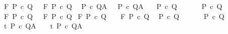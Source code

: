 \begin{isabellebody}
\ {\isachardoublequoteopen}{\isasymGamma}{\isacharcomma}{\isasymTheta}{\isasymturnstile}\isactrlbsub {\isacharslash}F\isactrlesub \ P\ c\ Q{\isachardoublequoteclose}\ \ {\isacharequal}{\isacharequal}\ {\isachardoublequoteopen}{\isasymGamma}{\isacharcomma}{\isasymTheta}{\isasymturnstile}\isactrlbsub {\isacharslash}F\isactrlesub \ P\ c\ Q{\isacharcomma}{\isacharbraceleft}{\isacharbraceright}{\isachardoublequoteclose}\isanewline
\ {\isachardoublequoteopen}{\isasymGamma}{\isacharcomma}{\isasymTheta}{\isasymturnstile}\ P\ c\ Q{\isacharcomma}A{\isachardoublequoteclose}\ {\isacharequal}{\isacharequal}\ {\isachardoublequoteopen}{\isasymGamma}{\isacharcomma}{\isasymTheta}{\isasymturnstile}\isactrlbsub {\isacharslash}{\isacharbraceleft}{\isacharbraceright}\isactrlesub \ P\ c\ Q{\isacharcomma}A{\isachardoublequoteclose}\ \isanewline
\isanewline
\ {\isachardoublequoteopen}{\isasymGamma}{\isasymturnstile}\ P\ c\ Q{\isachardoublequoteclose}\ \ \ \ {\isacharequal}{\isacharequal}\ \ {\isachardoublequoteopen}{\isasymGamma}{\isasymturnstile}\isactrlbsub {\isacharslash}{\isacharbraceleft}{\isacharbraceright}\isactrlesub \ P\ c\ Q{\isachardoublequoteclose}\isanewline
\ {\isachardoublequoteopen}{\isasymGamma}{\isasymturnstile}\isactrlbsub {\isacharslash}F\isactrlesub \ P\ c\ Q{\isachardoublequoteclose}\ \ {\isacharequal}{\isacharequal}\ {\isachardoublequoteopen}{\isasymGamma}{\isacharcomma}{\isacharbraceleft}{\isacharbraceright}{\isasymturnstile}\isactrlbsub {\isacharslash}F\isactrlesub \ P\ c\ Q{\isachardoublequoteclose}\isanewline
\ {\isachardoublequoteopen}{\isasymGamma}{\isasymturnstile}\isactrlbsub {\isacharslash}F\isactrlesub \ P\ c\ Q{\isachardoublequoteclose}\ \ {\isacharless}{\isacharequal}\ \ {\isachardoublequoteopen}{\isasymGamma}{\isasymturnstile}\isactrlbsub {\isacharslash}F\isactrlesub \ P\ c\ Q{\isacharcomma}{\isacharbraceleft}{\isacharbraceright}{\isachardoublequoteclose}\isanewline
\ {\isachardoublequoteopen}{\isasymGamma}{\isasymturnstile}\ P\ c\ Q{\isachardoublequoteclose}\ \ \ \ {\isacharless}{\isacharequal}\ \ {\isachardoublequoteopen}{\isasymGamma}{\isasymturnstile}\ P\ c\ Q{\isacharcomma}{\isacharbraceleft}{\isacharbraceright}{\isachardoublequoteclose}\isanewline
\isanewline
\isanewline
\isanewline
\isanewline
\ {\isachardoublequoteopen}{\isasymGamma}{\isasymturnstile}\isactrlsub t\ P\ c\ Q{\isacharcomma}A{\isachardoublequoteclose}\ \ \ {\isacharequal}{\isacharequal}\ {\isachardoublequoteopen}{\isasymGamma}{\isasymturnstile}\isactrlsub t\isactrlbsub {\isacharslash}{\isacharbraceleft}{\isacharbraceright}\isactrlesub \ P\ c\ Q{\isacharcomma}A{\isachardoublequoteclose}\isanewline

\end{isabellebody}

